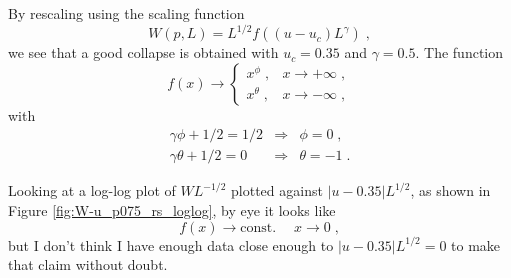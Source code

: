 \documentclass[a4paper,10pt]{article}
\newcommand{\fref}[1]{Figure \ref{#1}}
\begin{document}
By rescaling using the scaling function
\begin{equation}
 W(p,L) = L^{1/2}f( (u-u_c)L^\gamma ) \;,
\end{equation}
we see that a good collapse is obtained with $u_c = 0.35$ and $\gamma = 0.5$. The function
\begin{equation}
 f(x) \to \begin{cases}
              x^\phi \;, & x \to +\infty \;, \\
              x^\theta \;, & x \to -\infty \;,
             \end{cases}
\end{equation}
with
\begin{eqnarray}
 \gamma\phi + 1/2 = 1/2 &\Rightarrow& \phi = 0 \;, \nonumber \\
 \gamma\theta + 1/2 =  0 &\Rightarrow& \theta = -1 \;.
\end{eqnarray}

Looking at a log-log plot of $WL^{-1/2}$ plotted against $|u-0.35|L^{1/2}$, as shown in \fref{fig:W-u_p075_rs_loglog}, by eye it looks like 
\begin{equation}
 f(x)\to  \mbox{const.}\;\quad x\to0 \;,
\end{equation}
but I don't think I have enough data close enough to $|u-0.35|L^{1/2} = 0$ to make that claim without doubt.

\end{document}
